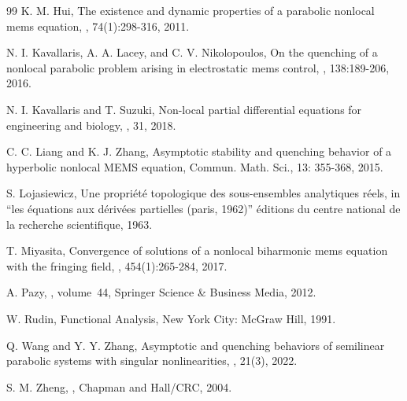 \documentclass{article}
\numberwithin{equation}{section}
\begin{document}
\begin{thebibliography}{99}
K. M. Hui,
\newblock The existence and dynamic properties of a parabolic nonlocal mems equation,
, 74(1):298-316, 2011.

N. I. Kavallaris, A. A. Lacey, and C. V. Nikolopoulos,
\newblock On the quenching of a nonlocal parabolic problem arising in electrostatic mems control,
, 138:189-206, 2016.

N. I. Kavallaris and T. Suzuki,
\newblock Non-local partial differential equations for engineering and biology,
, 31, 2018.

C. C. Liang and K. J. Zhang, Asymptotic stability and quenching behavior of a hyperbolic nonlocal MEMS equation, Commun. Math. Sci., 13: 355-368, 2015.

S. Lojasiewicz,
\newblock Une propri{\'e}t{\'e} topologique des sous-ensembles analytiques r{\'e}els, in “les {\'e}quations aux d{\'e}riv{\'e}es partielles (paris, 1962)” {\'e}ditions du centre national de la recherche scientifique, 1963.

T. Miyasita,
\newblock Convergence of solutions of a nonlocal biharmonic mems equation with the fringing field,
, 454(1):265-284, 2017.

A. Pazy,
, volume~44,
\newblock Springer Science \& Business Media, 2012.

W. Rudin, Functional Analysis, New York City: McGraw Hill, 1991.

Q. Wang and Y. Y. Zhang,
\newblock Asymptotic and quenching behaviors of semilinear parabolic systems with singular nonlinearities,
, 21(3), 2022.

S. M. Zheng,
,
\newblock Chapman and Hall/CRC, 2004.

\end{thebibliography}
\end{document}

